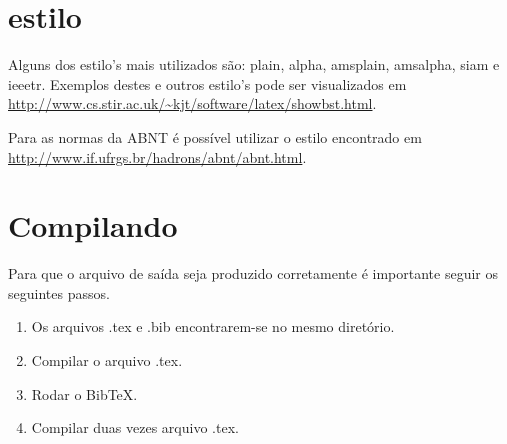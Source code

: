 \section{\textsf{estilo}}

Alguns dos \textsf{estilo}'s mais utilizados são: \textsf{plain}, \textsf{alpha}, \textsf{amsplain}, \textsf{amsalpha}, \textsf{siam} e \textsf{ieeetr}. Exemplos destes e outros \textsf{estilo}'s pode ser visualizados em \url{http://www.cs.stir.ac.uk/~kjt/software/latex/showbst.html}.

Para as normas da ABNT é possível utilizar o \textsf{estilo} encontrado em \url{http://www.if.ufrgs.br/hadrons/abnt/abnt.html}.

\section{Compilando}

Para que o arquivo de saída seja produzido corretamente é importante seguir os seguintes passos.
\begin{enumerate}
    \item Os arquivos \textsf{.tex} e \textsf{.bib} encontrarem-se no mesmo diretório.
    \item Compilar o arquivo \textsf{.tex}.
    \item Rodar o BibTeX.
    \item Compilar duas vezes arquivo \textsf{.tex}.
\end{enumerate}
